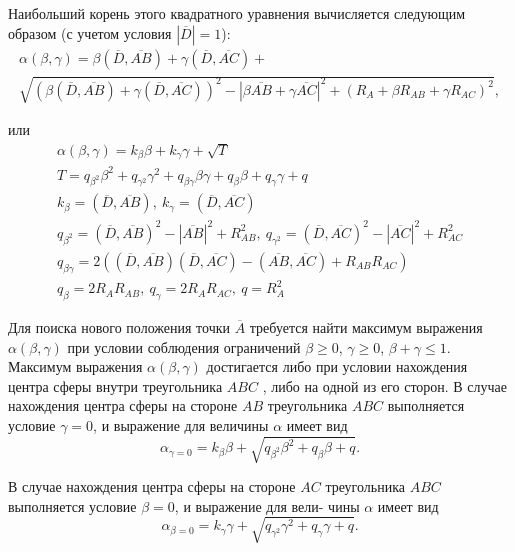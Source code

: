 Наибольший корень этого квадратного уравнения вычисляется следующим образом (с учетом условия $|\overline{D}| = 1$):
\begin{multline}
	\alpha(\beta, \gamma) = \beta (\overline{D}, \overline{AB}) + \gamma (\overline{D}, \overline{AC}) + \\
	\sqrt{(\beta (\overline{D}, \overline{AB}) + \gamma (\overline{D}, \overline{AC}))^2 - |\beta \overline{AB} + \gamma \overline{AC}|^2 + (R_A + \beta R_{AB} + \gamma R_{AC})^2},
\end{multline}

или
\begin{equation}
	\begin{aligned}
		\alpha(\beta, \gamma) = k_{\beta} \beta + k_{\gamma} \gamma + \sqrt{T} \\
		T = q_{\beta^2} \beta^2 + q_{\gamma^2} \gamma^2 + q_{\beta \gamma} \beta \gamma + q_{\beta} \beta + q_{\gamma} \gamma + q \\
		k_{\beta} = (\overline{D}, \overline{AB}), \ k_{\gamma} = (\overline{D}, \overline{AC}) \\
		q_{\beta^2} = (\overline{D}, \overline{AB})^2 - |\overline{AB}|^2 + R_{AB}^2, \ q_{\gamma^2} = (\overline{D}, \overline{AC})^2 - |\overline{AC}|^2 + R_{AC}^2 \\
		q_{\beta \gamma} = 2 \left( (\overline{D}, \overline{AB}) (\overline{D}, \overline{AC}) - (\overline{AB}, \overline{AC}) + R_{AB}R_{AC} \right) \\
		q_{\beta} = 2 R_A R_{AB}, \ q_{\gamma} = 2 R_A R_{AC}, \ q = R_A^2
	\end{aligned}
\end{equation}

Для поиска нового положения точки $\overline{A}$ требуется найти максимум выражения $\alpha(\beta,\gamma)$ при условии соблюдения ограничений $\beta \ge 0$, $\gamma \ge 0$, $\beta + \gamma \le 1$.
Максимум выражения $\alpha(\beta, \gamma)$ достигается либо при условии нахождения центра сферы внутри треугольника $ABC$ , либо на одной из его сторон.
В случае нахождения центра сферы на стороне $AB$ треугольника $ABC$ выполняется условие $\gamma = 0$, и выражение для величины $\alpha$ имеет вид
\begin{equation}
	\alpha_{\gamma = 0} = k_{\beta} \beta + \sqrt{q_{\beta^2} \beta^2 + q_{\beta} \beta + q}.
\end{equation}

В случае нахождения центра сферы на стороне $AC$ треугольника $ABC$ выполняется условие $\beta = 0$, и выражение для вели-
чины $\alpha$ имеет вид
\begin{equation}
	\alpha_{\beta = 0} = k_{\gamma} \gamma + \sqrt{q_{\gamma^2} \gamma^2 + q_{\gamma} \gamma + q}.
\end{equation}

